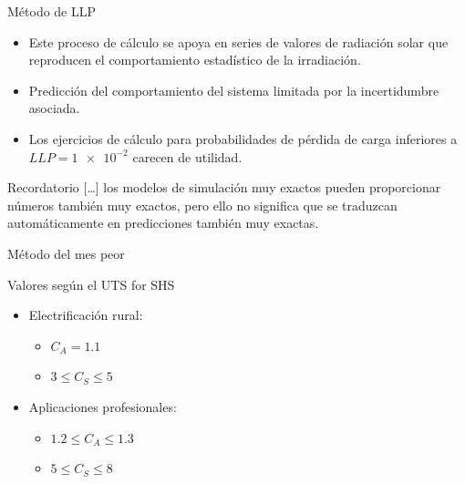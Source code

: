 \documentclass[xcolor={usenames,svgnames,dvipsnames}]{beamer}
\begin{document}
\begin{frame}[label=sec-1-4-6]{Método de LLP}
\begin{itemize}
\item Este proceso de cálculo se apoya en series de valores de radiación solar que reproducen el comportamiento estadístico de la irradiación.

\item Predicción del comportamiento del sistema limitada por la incertidumbre asociada.

\item Los ejercicios de cálculo para probabilidades de pérdida de carga inferiores a $LLP=\num{1e-2}$ carecen de utilidad.
\end{itemize}

\begin{block}{Recordatorio}
\guillemotleft{}[\ldots{}] los modelos de simulación muy exactos pueden proporcionar números también muy exactos, pero ello no significa que se traduzcan automáticamente en predicciones también muy exactas.\guillemotright{}
\end{block}
\end{frame}

\begin{frame}[label=sec-1-4-7]{Método del mes peor}
\begin{block}{Valores según el UTS for SHS}
\begin{itemize}
\item Electrificación rural:

\begin{itemize}
\item $C_{A}=1.1$

\item $3\leq C_{S}\leq5$
\end{itemize}

\item Aplicaciones profesionales:

\begin{itemize}
\item $1.2\leq C_{A}\leq1.3$

\item $5\leq C_{S}\leq8$
\end{itemize}
\end{itemize}
\end{block}
\end{frame}
\end{document}
